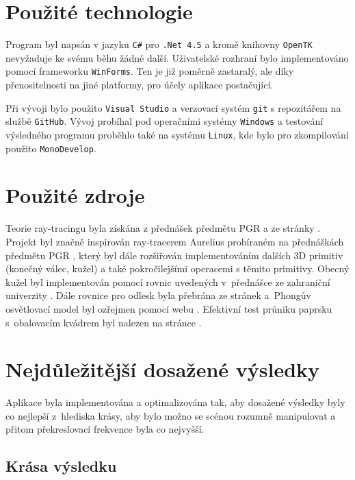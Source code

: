 \documentclass[12pt,a4paper,titlepage,final]{report}
\begin{document}
\chapter{Použité technologie}
Program byl napsán v jazyku \texttt{C\#} pro \texttt{.Net 4.5} a kromě knihovny \texttt{OpenTK} nevyžaduje ke svému běhu žádné další. Uživatelské rozhraní bylo implementováno pomocí frameworku \texttt{WinForms}. Ten je již poměrně zastaralý, ale díky přenositelnosti na jiné platformy, pro účely aplikace postačující.

Při vývoji bylo použito \texttt{Visual Studio} a verzovací systém \texttt{git} s repozitářem na službě \texttt{GitHub}. Vývoj probíhal pod operačními systémy \texttt{Windows} a testování výsledného programu proběhlo také na systému \texttt{Linux}, kde bylo pro zkompilování použito \texttt{MonoDevelop}.


\begingroup
\let\clearpage\relax
\chapter{Použité zdroje}
Teorie ray-tracingu byla získána z přednášek předmětu PGR a ze stránky \cite{scratchapixel}. Projekt byl značně inspirován ray-tracerem Aurelius probíraném na přednáškách předmětu PGR \cite{aurelius}, který byl dále rozšiřován implementováním dalších 3D primitiv (konečný válec, kužel) a také pokročilejšími operacemi s těmito primitivy. Obecný kužel byl implementován pomocí rovnic uvedených v~přednášce ze zahraniční univerzity \cite{cone}. Dále rovnice pro odlesk byla přebrána ze stránek \cite{reflect} a~Phongův osvětlovací model byl ozřejmen pomocí webu \cite{phong}. Efektivní test průniku paprsku s~obalovacím kvádrem byl nalezen na stránce \cite{aabb}.

\endgroup

\chapter{Nejdůležitější dosažené výsledky}
Aplikace byla implementována a optimalizována tak, aby dosažené výsledky byly co nejlepší z~hlediska krásy, aby bylo možno se scénou rozumně manipulovat a přitom překreslovací frekvence byla co nejvyšší.

\section{Krása výsledku}
\end{document}

